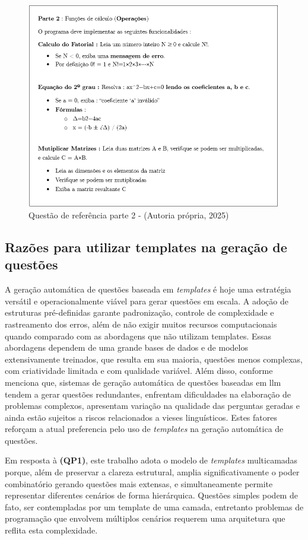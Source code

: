 \begin{figure}[ht]
    \centering
    \includegraphics[width=12cm]{./imagens/capitulo4/questao-referencia-2.png}
    \caption{Questão de referência parte 2 - (Autoria própria, 2025)}
    \label{fig:questao-referencia-part-2}
\end{figure}


\subsection{Razões para utilizar templates na geração de questões}

A geração automática de questões baseada em \textit{templates} é hoje uma estratégia versátil e operacionalmente viável para gerar questões em escala. A adoção de estruturas pré-definidas garante padronização, controle de complexidade e rastreamento dos erros, além de não exigir muitos recursos computacionais quando comparado com as abordagens que não utilizam templates. Essas abordagens dependem de uma grande bases de dados e de modelos extensivamente treinados, que resulta em sua maioria, questões menos complexas, com criatividade limitada e com qualidade variável. Além disso, conforme \parencite{maity2024} menciona que, sistemas de geração automática de questões  baseadas em \gls{llm} tendem a gerar questões redundantes, enfrentam dificuldades na elaboração de problemas complexos, apresentam variação na qualidade das perguntas geradas e ainda estão sujeitos a riscos relacionados a vieses linguísticos. Estes fatores reforçam a atual preferencia pelo uso de \textit{templates} na geração automática de questões.

Em resposta à \textbf{(QP1)}, este trabalho adota o modelo de \textit{templates} multicamadas porque, além de preservar a clareza estrutural, amplia significativamente o poder combinatório gerando questões mais extensas, e simultaneamente permite representar diferentes cenários de forma  hierárquica. Questões simples podem de fato, ser contempladas por um template de uma camada, entretanto problemas de programação que envolvem múltiplos cenários requerem uma arquitetura que reflita esta complexidade.

